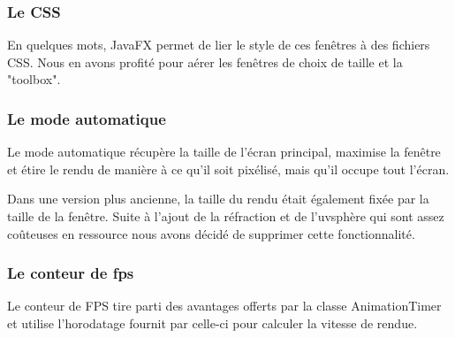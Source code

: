 \subsubsection{Le CSS}

En quelques mots, JavaFX permet de lier le style de ces fenêtres à des fichiers CSS. Nous en avons profité pour aérer les fenêtres de choix de taille et la "toolbox".

\subsubsection{Le mode automatique}

Le mode automatique récupère la taille de l'écran principal, maximise la fenêtre et étire le rendu de manière à ce qu'il soit pixélisé, mais qu'il occupe tout l'écran.

Dans une version plus ancienne, la taille du rendu était également fixée par la taille de la fenêtre. Suite à l'ajout de la réfraction et de l'uvsphère qui sont assez coûteuses en ressource nous avons décidé de supprimer cette fonctionnalité.

\subsubsection{Le conteur de fps}

Le conteur de FPS tire parti des avantages offerts par la classe AnimationTimer et utilise l'horodatage fournit par celle-ci pour calculer la vitesse de rendue.
